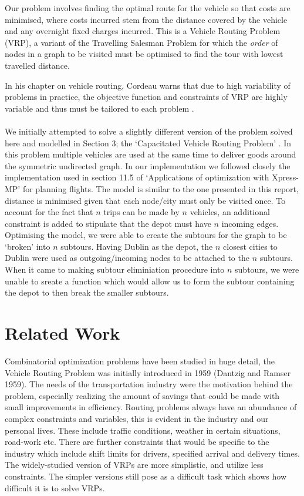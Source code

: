 \documentclass[a4paper,11pt]{article}
\begin{document}
Our problem involves finding the optimal route for the vehicle so that costs are minimised, where costs incurred stem from the distance covered by the vehicle and any overnight fixed charges incurred. This is a Vehicle Routing Problem (VRP), a variant of the Travelling Salesman Problem for which the \textit{order} of nodes in a graph to be visited must be optimised to find the tour with lowest travelled distance. 

In his chapter on vehicle routing, Cordeau warns that due to high variability of problems in practice, the objective function and constraints of VRP are highly variable and thus must be tailored to each problem \cite{cordeau2007vehicle}.
\\\\
We initially attempted to solve a slightly different version of the problem solved here and modelled in Section 3; the `Capacitated Vehicle Routing Problem' \cite{toth2002models}. In this problem multiple vehicles are used at the same time to deliver goods around the symmetric undirected graph. In our implementation we followed closely the implementation used in section 11.5 of  `Applications of optimization with Xpress-MP'  \cite{gueret1999applications} for planning flights. The model is similar to the one presented in this report, distance is minimised given that each node/city must only be visited once. To account for the fact that $n$ trips can be made by $n$ vehicles, an additional constraint is added to stipulate that the depot must have $n$ incoming edges. Optimising the model, we were able to create the subtours for the graph to be `broken' into $n$ subtours. Having Dublin as the depot, the $n$ closest cities to Dublin were used as outgoing/incoming nodes to be attached to the $n$ subtours. When it came to making subtour eliminiation procedure into $n$ subtours, we were unable to sreate a function which would allow us to form the subtour containing the depot to then break the smaller subtours.



\section{Related Work}

Combinatorial optimization problems have been studied in huge detail, the Vehicle Routing Problem was initially introduced in 1959 (Dantzig and Ramser 1959). The needs of the transportation industry were the motivation behind the problem, especially realizing the amount of savings that could be made with small improvements in efficiency. Routing problems always have an abundance of complex constraints and variables, this is evident in the industry and our personal lives. These include traffic conditions, weather in certain situations, road-work etc. There are further constraints that would be specific to the industry which include shift limits for drivers, specified arrival and delivery times. The widely-studied version of VRPs are more simplistic, and utilize less constraints. The simpler versions still pose as a difficult task which shows how difficult it is to solve VRPs. 
\end{document}
